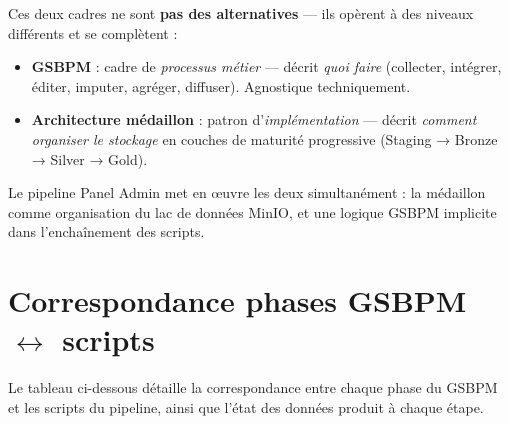 \documentclass[12pt,a4paper,french]{report}
\begin{document}
\begin{infobox}
  Ces deux cadres ne sont \textbf{pas des alternatives} — ils opèrent à des
  niveaux différents et se complètent :
  \begin{itemize}[nosep]
    \item \textbf{GSBPM} : cadre de \textit{processus métier} — décrit \textit{quoi faire}
          (collecter, intégrer, éditer, imputer, agréger, diffuser). Agnostique
          techniquement.
    \item \textbf{Architecture médaillon} : patron d'\textit{implémentation} —
          décrit \textit{comment organiser le stockage} en couches de maturité
          progressive (Staging → Bronze → Silver → Gold).
  \end{itemize}
  Le pipeline Panel Admin met en \oe{}uvre les deux simultanément : la médaillon
  comme organisation du lac de données MinIO, et une logique GSBPM implicite dans
  l'enchaînement des scripts.
\end{infobox}

\section{Correspondance phases GSBPM \texorpdfstring{$\leftrightarrow$}{<->} scripts}

Le tableau ci-dessous détaille la correspondance entre chaque phase du GSBPM
et les scripts du pipeline, ainsi que l'état des données produit à chaque étape.
\end{document}
